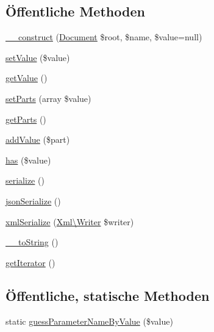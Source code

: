\subsection*{Öffentliche Methoden}
\begin{DoxyCompactItemize}
\item 
\mbox{\hyperlink{class_sabre_1_1_v_object_1_1_parameter_a0541a4071dd11fefdec5ca2a2f9cb0ef}{\+\_\+\+\_\+construct}} (\mbox{\hyperlink{class_sabre_1_1_v_object_1_1_document}{Document}} \$root, \$name, \$value=null)
\item 
\mbox{\hyperlink{class_sabre_1_1_v_object_1_1_parameter_ad7f8012aa4f4de86c93784c1710e4006}{set\+Value}} (\$value)
\item 
\mbox{\hyperlink{class_sabre_1_1_v_object_1_1_parameter_a5a810d3aa19c03ef6094a07dc4bb81a6}{get\+Value}} ()
\item 
\mbox{\hyperlink{class_sabre_1_1_v_object_1_1_parameter_a4dea2cbcdaaac46f0a20bf38839a723c}{set\+Parts}} (array \$value)
\item 
\mbox{\hyperlink{class_sabre_1_1_v_object_1_1_parameter_a69b2cbaaf2e01e93b73f6670a455668e}{get\+Parts}} ()
\item 
\mbox{\hyperlink{class_sabre_1_1_v_object_1_1_parameter_aed4ef3e73a4dcdb57161c403cbaddd0e}{add\+Value}} (\$part)
\item 
\mbox{\hyperlink{class_sabre_1_1_v_object_1_1_parameter_a2d9a335e83c3e3f7847a8ce64f47baa1}{has}} (\$value)
\item 
\mbox{\hyperlink{class_sabre_1_1_v_object_1_1_parameter_a8256c846b0508fce0023186406ed1929}{serialize}} ()
\item 
\mbox{\hyperlink{class_sabre_1_1_v_object_1_1_parameter_a6a6ee0974478dc6111b5dd7854e4cbb2}{json\+Serialize}} ()
\item 
\mbox{\hyperlink{class_sabre_1_1_v_object_1_1_parameter_a3b34be686007dc4a97190ae2d91ead27}{xml\+Serialize}} (\mbox{\hyperlink{class_sabre_1_1_xml_1_1_writer}{Xml\textbackslash{}\+Writer}} \$writer)
\item 
\mbox{\hyperlink{class_sabre_1_1_v_object_1_1_parameter_a017266c4b9fa14f6d2e5902be6f02fa3}{\+\_\+\+\_\+to\+String}} ()
\item 
\mbox{\hyperlink{class_sabre_1_1_v_object_1_1_parameter_aa9acea2a752ecd0f4c22e4af4a73afa4}{get\+Iterator}} ()
\end{DoxyCompactItemize}
\subsection*{Öffentliche, statische Methoden}
\begin{DoxyCompactItemize}
\item 
static \mbox{\hyperlink{class_sabre_1_1_v_object_1_1_parameter_a02ccbbe5c92412e36825af7c8670e1b4}{guess\+Parameter\+Name\+By\+Value}} (\$value)
\end{DoxyCompactItemize}

